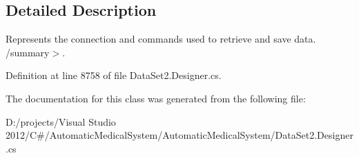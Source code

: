 \subsection{Detailed Description}
Represents the connection and commands used to retrieve and save data. /summary$>$. 

Definition at line 8758 of file DataSet2.Designer.cs.

The documentation for this class was generated from the following file:\begin{CompactItemize}
\item 
D:/projects/Visual Studio 2012/C\#/AutomaticMedicalSystem/AutomaticMedicalSystem/DataSet2.Designer.cs\end{CompactItemize}
